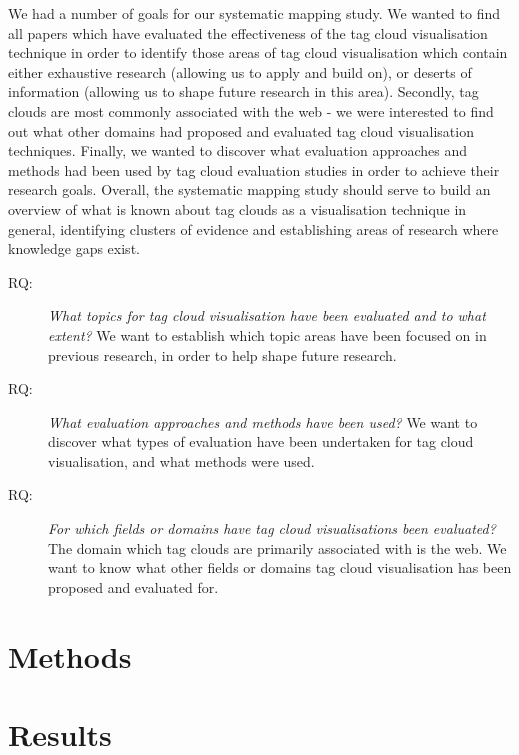 We had a number of goals for our systematic mapping study. We wanted to find all papers which have evaluated the effectiveness of the tag cloud visualisation technique in order to identify those areas of tag cloud visualisation which contain either exhaustive research (allowing us to apply and build on), or deserts of information (allowing us to shape future research in this area). Secondly, tag clouds are most commonly associated with the web - we were interested to find out what other domains had proposed and evaluated tag cloud visualisation techniques. Finally, we wanted to discover what evaluation approaches and methods had been used by tag cloud evaluation studies in order to achieve their research goals. Overall, the systematic mapping study should serve to build an overview of what is known about tag clouds as a visualisation technique in general, identifying clusters of evidence and establishing areas of research where knowledge gaps exist. 

\begin{description}
\item[RQ:] \textit{What topics for tag cloud visualisation have been evaluated and to what extent?} We want to establish which topic areas have been focused on in previous research, in order to help shape future research.
\item[RQ:] \textit{What evaluation approaches and methods have been used?} We want to discover what types of evaluation have been undertaken for tag cloud visualisation, and what methods were used.
\item[RQ:]\textit{ For which fields or domains have tag cloud visualisations been evaluated?} The domain which tag clouds are primarily associated with is the web. We want to know what other fields or domains tag cloud visualisation has been proposed and evaluated for. 
\end{description}


%

\section{Methods}\label{sect:mappingmethods}


\section{Results}\label{sect:mappingresults}


